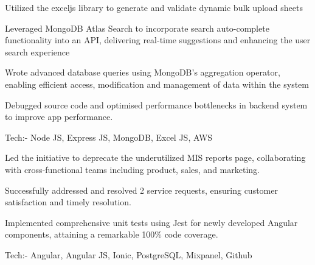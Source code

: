 \documentclass[]{deedy-resume-openfont}
\begin{document}
\begin{minipage}[t]{0.66\textwidth}
\begin{tightemize}
\item Utilized the exceljs library to generate and validate dynamic bulk upload sheets
\item Leveraged MongoDB Atlas Search to incorporate search auto-complete functionality into an API, delivering real-time suggestions and enhancing the user search experience
\item Wrote advanced database queries using MongoDB’s aggregation operator, enabling efficient access, modification and management of data within the system
\item Debugged source code and optimised performance bottlenecks in backend system to improve app performance.
\item Tech:- Node JS, Express JS, MongoDB, Excel JS, AWS
\end{tightemize}
\sectionsep

\begin{tightemize}
\item Led the initiative to deprecate the underutilized MIS reports page, collaborating with cross-functional teams including product, sales, and marketing.
\item Successfully addressed and resolved 2 service requests, ensuring customer satisfaction and timely resolution.
\item Implemented comprehensive unit tests using Jest for newly developed Angular components, attaining a remarkable 100\% code coverage.
\item Tech:- Angular, Angular JS, Ionic, PostgreSQL, Mixpanel, Github
\end{tightemize}
\sectionsep





\end{minipage}
\end{document}
